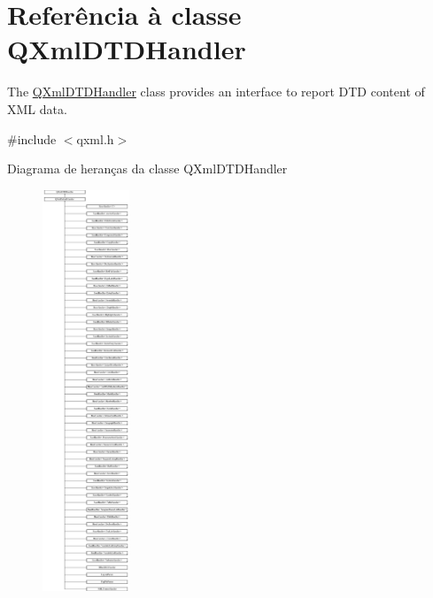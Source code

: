 \hypertarget{class_q_xml_d_t_d_handler}{\section{Referência à classe Q\-Xml\-D\-T\-D\-Handler}
\label{class_q_xml_d_t_d_handler}
}


The \hyperlink{class_q_xml_d_t_d_handler}{Q\-Xml\-D\-T\-D\-Handler} class provides an interface to report D\-T\-D content of X\-M\-L data.  




{\ttfamily \#include $<$qxml.\-h$>$}

Diagrama de heranças da classe Q\-Xml\-D\-T\-D\-Handler\begin{figure}[H]
\begin{center}
\leavevmode
\includegraphics[height=12.000000cm]{class_q_xml_d_t_d_handler}
\end{center}
\end{figure}
